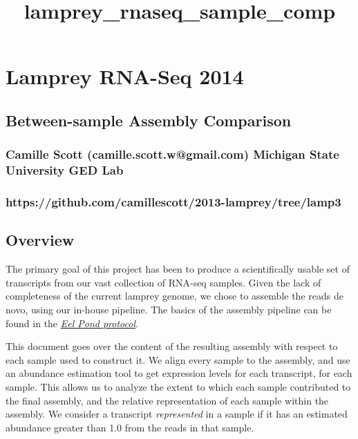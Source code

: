 \documentclass{article}
\title{lamprey\_rnaseq\_sample\_comp}
\begin{document}
    
    
    \maketitle
    
    

    

    \section{Lamprey RNA-Seq 2014}



    \subsection{Between-sample Assembly Comparison}



    \subsubsection{Camille Scott (camille.scott.w@gmail.com) Michigan State University GED
Lab}



    \subsubsection{https://github.com/camillescott/2013-lamprey/tree/lamp3}



    \subsection{Overview}


    The primary goal of this project has been to produce a scientifically
usable set of transcripts from our vast collection of RNA-seq samples.
Given the lack of completeness of the current lamprey genome, we chose
to assemble the reads de novo, using our in-house pipeline. The basics
of the assembly pipeline can be found in the
\emph{\href{https://khmer-protocols.readthedocs.org/en/v0.8.4/mrnaseq/}{Eel
Pond protocol}}.

This document goes over the content of the resulting assembly with
respect to each sample used to construct it. We align every sample to
the assembly, and use an abundance estimation tool to get expression
levels for each transcript, for each sample. This allows us to analyze
the extent to which each sample contributed to the final assembly, and
the relative representation of each sample within the assembly. We
consider a transcript \emph{represented} in a sample if it has an
estimated abundance greater than 1.0 from the reads in that sample.
\end{document}
